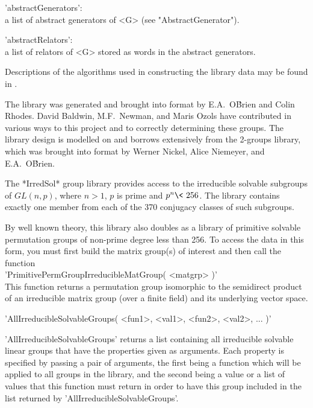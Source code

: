 'abstractGenerators': \\
        a list of abstract generators of <G> (see "AbstractGenerator").

'abstractRelators': \\
        a  list of  relators  of <G>  stored  as  words in  the  abstract
        generators.

Descriptions of the algorithms used in constructing  the library data may
be found in \cite{OBr90,OBr91}.

The library was generated and brought into {\GAP} format by E.A.~O\'Brien
and  Colin Rhodes.  David Baldwin,  M.F.~Newman,  and   Maris Ozols  have
contributed in various ways to this  project and to correctly determining
these groups.  The library  design is modelled on and borrows extensively
from  the  2-groups  library, which  was  brought  into {\GAP}  format by
Werner Nickel, Alice Niemeyer, and E.A.~O\'Brien.

\newpage
{}

The *IrredSol* group library  provides access to the irreducible solvable
subgroups of $GL(n,p)$,  where $n >  1$, $p$ is prime  and $p^n \<\ 256$.
The  library contains exactly one member  from each  of the 370 conjugacy
classes of such subgroups.

By well known theory, this library also doubles as a library of primitive
solvable permutation groups of non-prime degree less than 256.  To access
the  data in  this form, you   must first  build  the  matrix group(s) of
interest and then call the function \\{}
'PrimitivePermGroupIrreducibleMatGroup( <matgrp> )' \\{}
This  function returns a permutation  group  isomorphic to the semidirect
product of an   irreducible matrix group  (over a  finite field) and  its
underlying vector space.

\vspace{5mm}
'AllIrreducibleSolvableGroups( <fun1>, <val1>, <fun2>, <val2>, ... )'%

'AllIrreducibleSolvableGroups' returns a  list containing all irreducible
solvable linear groups that have the properties given as arguments.  Each
property is specified by  passing a pair  of arguments, the first being a
function which will be   applied to all  groups  in the library, and  the
second being a  value or a list of  values that this function must return
in  order to     have this group    included  in  the   list  returned by
'AllIrreducibleSolvableGroups'.

